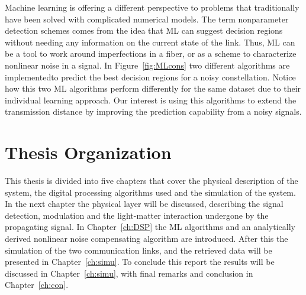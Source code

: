 Machine learning is offering a different perspective to problems that traditionally have been solved with complicated numerical models. The term nonparameter detection schemes comes from the idea that ML can suggest decision regions without needing any information on the current state of the link. Thus, ML can be a tool to work around imperfections in a fiber, or as a scheme to characterize nonlinear noise in a signal. In Figure~\ref{fig:MLcons} two different algorithms are implementedto predict the best decision regions for a noisy constellation. Notice how this two ML algorithms perform differently for the same dataset due to their individual learning approach. Our interest is using this algorithms to extend the transmission distance by improving the prediction capability from a noisy signals.   





 



\section{Thesis Organization}

This thesis is divided into five chapters that cover the physical description of the system, the digital processing algorithms used and the simulation of the system. In the next chapter the physical layer will be discussed, describing the signal detection, modulation  and the light-matter interaction undergone by the propagating signal. In Chapter~\ref{ch:DSP} the ML algorithms and an analytically derived nonlinear noise compensating algorithm are introduced. After this the simulation of the two communication links, and the retrieved data will be presented in Chapter~\ref{ch:simu}. To conclude this report the results will be discussed in Chapter~\ref{ch:simu}, with final remarks and conclusion in Chapter~\ref{ch:con}.  


